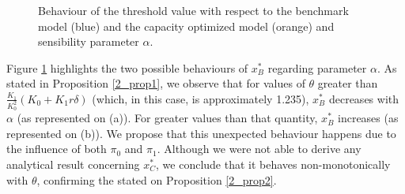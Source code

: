 	\begin{figure}[!htb]
		\begin{subfigmatrix}{2}
		\end{subfigmatrix}
		\caption{Behaviour of the threshold value with respect to the benchmark model (blue) and the capacity optimized model (orange) and sensibility parameter $\alpha$.}
		\label{fig:2_x4}
	\end{figure}
	
Figure \ref{fig:2_x4} highlights the two possible behaviours of $x^*_B$ regarding parameter $\alpha$. As stated in Proposition \ref{2_prop1}, we observe that for values of $\theta$ greater than $\frac{K_1}{ K_0^2} (K_0+K_1 r \delta)$ (which, in this case, is approximately 1.235), $x^*_B$ decreases with $\alpha$ (as represented on (a)). For greater values than that quantity, $x^*_B$ increases (as represented on (b)). We propose that this unexpected behaviour happens due to the influence of both $\pi_0$ and $\pi_1$.
Although we were not able to derive any analytical result concerning $x^*_C$, we conclude that it behaves non-monotonically with $\theta$, confirming the stated on Proposition \ref{2_prop2}.




